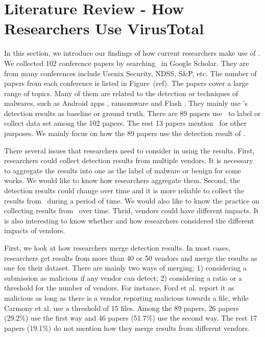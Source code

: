 \section{Literature Review - How Researchers Use VirusTotal}

In this section, we introduce our findings of how current researchers make use of \vt. 
We collected 102 conference papers by searching \vt\ in Google Scholar. 
They are from many conferences include Usenix Security, NDSS, S\&P, etc. 
The number of papers from each conference is listed in Figure~(ref). %
The papers cover a large range of topics. 
Many of them are related to the detection or techniques of malwares, such as Android apps \cite{arp2014drebin,huangvt2016bigdata}, ransomware \cite{kharraz2016unveil} and Flash \cite{ford2009analyzing}. 
They mainly use \vt's detection results as baseline or ground truth. 
There are 89 papers use \vt\ to label or collect data set among the 102 papers. 
The rest 13 papers mention \vt\ for other purposes. 
We mainly focus on how the 89 papers use the detection result of \vt.

There several issues that researchers need to consider in using the results. 
First, researchers could collect detection results from multiple vendors. 
It is necessary to aggregate the results into one as the label of malware or benign for some works. 
We would like to know how researchers aggregate them. 
Second, the detection results could change over time and it is more reliable to collect the results from \vt\ during a period of time. 
We would also like to know the practice on collecting results from \vt\ over time. 
Thrid, vendors could have different impacts. 
It is also interesting to know whether and how researchers considered the different impacts of vendors.

First, we look at how researchers merge detection results. 
In most cases, researchers get results from more than 40 or 50 vendors and merge the results as one for their dataset. 
There are mainly two ways of merging: 1) considering a submission as malicious if any vendor can detect; 2) considering a ratio or a threshold for the number of vendors. 
For instance, Ford et al. \cite{ford2009analyzing} report it as malicious as long as there is a vendor reporting malicious
towards a file, while Carmony et al. use a threshold of 15 files. 
Among the 89 papers, 26 papers (29.2\%) use the first way and 46 papers  (51.7\%) use the second way. 
The rest 17 papers (19.1\%) do not mention how they merge results from different vendors.

